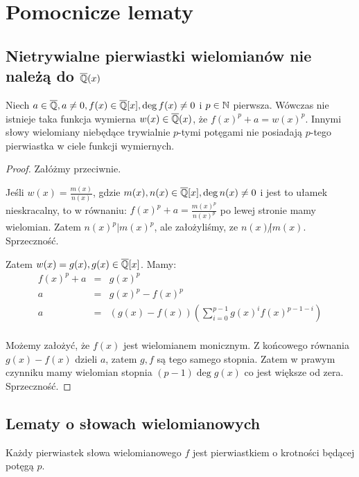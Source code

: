 \chapter{Pomocnicze lematy}
\section{Nietrywialne pierwiastki wielomianów nie należą do $\overline{\mathbb{Q}}(x)$}
\begin{lemma}
  Niech $a \in \overline{\mathbb{Q}}, a \neq 0, f(x) \in \overline{\mathbb{Q}}[x], \deg f(x)
  \neq 0$ i $p \in \mathbb{N}$ pierwsza.  Wówczas nie istnieje taka funkcja wymierna
  $w(x) \in \overline{\mathbb{Q}}(x)$, że $f(x)^{p} + a = w(x)^p$. Innymi słowy
  wielomiany niebędące trywialnie $p$-tymi potęgami nie posiadają $p$-tego
  pierwiastka w ciele funkcji wymiernych.
  \label{lem:nontrivial_roots}
\end{lemma}

\begin{proof}
Załóżmy przeciwnie.

Jeśli $w(x) = \frac{m(x)}{n(x)}$, gdzie $m(x), n(x) \in \overline{\mathbb{Q}}[x], \deg
n(x) \neq 0$ i jest to ułamek nieskracalny, to w równaniu: $f(x)^{p} + a =
\frac{m(x)^p}{n(x)^p}$ po lewej stronie mamy wielomian. Zatem $n(x)^p | m(x)^p$,
ale założyliśmy, ze $n(x) \! \not| m(x)$. Sprzeczność.

Zatem $w(x) = g(x), g(x) \in \overline{\mathbb{Q}}[x]$. Mamy:
\begin{eqnarray*}
  f(x)^p + a &=& g(x)^p \\
  a &=& g(x)^p - f(x)^p\\
  a &=& \left(g(x) - f(x)\right)\left(\sum_{i=0}^{p-1}g(x)^if(x)^{p-1 - i}\right)\\
\end{eqnarray*}

Możemy założyć, że $f(x)$ jest wielomianem monicznym. Z końcowego równania $g(x)
- f(x)$ dzieli $a$, zatem $g, f$ są tego samego stopnia. Zatem w prawym
czynniku mamy wielomian stopnia $(p-1)\deg g(x)$ co jest większe od zera.
Sprzeczność.
\end{proof}

\section{Lematy o słowach wielomianowych} 
\begin{lemma}
  Każdy pierwiastek słowa wielomianowego $f$ jest pierwiastkiem o krotności
  będącej potęgą $p$.
\end{lemma}

